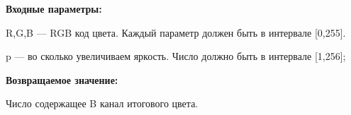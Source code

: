 \textbf{Входные параметры:}  

R,G,B --- RGB код цвета. Каждый параметр должен быть в интервале [0,255].

p --- во сколько увеличиваем яркость. Число должно быть в интервале [1,256];

\textbf{Возвращаемое значение:}

Число содержащее B канал итогового цвета.